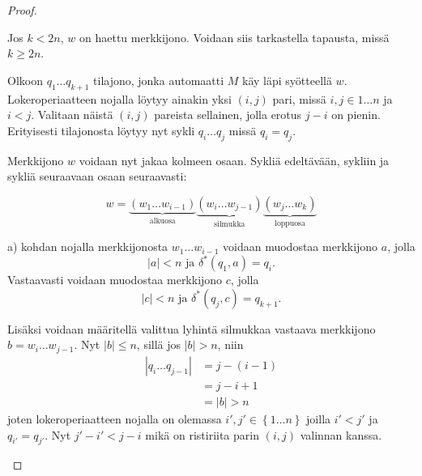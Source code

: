 \documentclass[a4paper,11pt,draft]{article}
\newcommand{\set}[1]{{\left\{ #1 \right\}}}
\begin{document}
\begin{enumerate}
\begin{enumerate}
\begin{proof}
\begin{description}
          Jos $k < 2n$, $w$ on haettu merkkijono. Voidaan siis
          tarkastella tapausta, missä $k \ge 2n$.

          Olkoon $q_1 \ldots q_{k+1}$ tilajono, jonka automaatti $M$
          käy läpi syötteellä $w$. Lokeroperiaatteen nojalla löytyy
          ainakin yksi $(i, j)$ pari, missä $i,j \in {1 \ldots n}$ ja
          $i < j$. Valitaan näistä $(i, j)$ pareista sellainen, jolla
          erotus $j - i$ on pienin. Erityisesti tilajonosta löytyy nyt
          sykli $q_i \dots q_j$ missä $q_i = q_j$.

          Merkkijono $w$ voidaan nyt jakaa kolmeen osaan. Sykliä
          edeltävään, sykliin ja sykliä seuraavaan osaan seuraavasti:

          \begin{equation*}
            w = \underbrace{(w_1 \dots w_{i-1})}_\textrm{alkuosa}
                \underbrace{(w_i \dots w_{j-1})}_\textrm{silmukka}
                \underbrace{(w_j \dots w_k)}_\textrm{loppuosa}
          \end{equation*}

          a) kohdan nojalla merkkijonosta $w_1 \ldots w_{i-1}$
          voidaan muodostaa merkkijono $a$, jolla
          \begin{equation*}
            |a| < n \textrm{ ja } \delta^*(q_1,a) = q_i \textrm{.}
          \end{equation*}
          Vastaavasti voidaan muodostaa merkkijono $c$, jolla
          \begin{equation*}
            |c| < n \textrm{ ja } \delta^*(q_j,c) = q_{k+1} \textrm{.}
          \end{equation*}

          Lisäksi voidaan määritellä valittua lyhintä silmukkaa
          vastaava merkkijono $b = w_i \dots w_{j-1}$. Nyt $|b| \le
          n$, sillä jos $|b| > n$, niin
          \begin{align*}
          |q_i \dots q_{j-1}| & = j - (i - 1) \\
          & = j - i + 1 \\
          & = |b| > n
          \end{align*}
          joten lokeroperiaatteen nojalla on olemassa $i', j' \in
          \set{1 \dots n}$ joilla $i' < j'$ ja $q_{i'} = q_{j'}$. Nyt
          $j' - i' < j - i$ mikä on ristiriita parin $(i, j)$ valinnan
          kanssa.


\end{description}
\end{proof}
\end{enumerate}
\end{enumerate}
\end{document}
